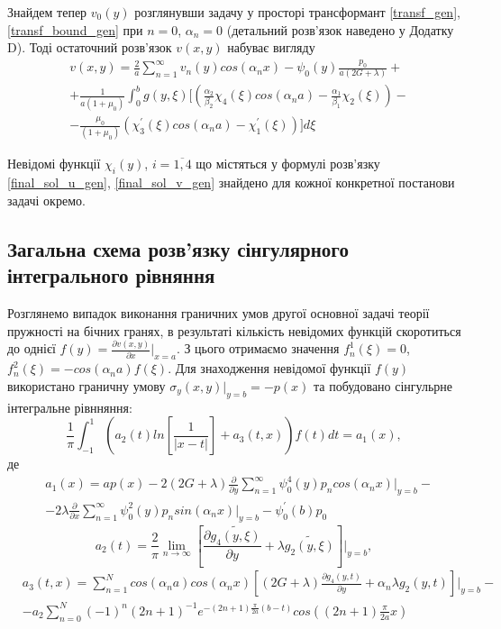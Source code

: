 Знайдем тепер $v_0(y)$ розглянувши задачу у просторі трансформант \eqref{transf_gen}, \eqref{transf_bound_gen} при $n=0$, $\alpha_n = 0$
(детальний розв'язок наведено у Додатку D). Тоді остаточний розв'язок $v(x,y)$ набуває вигляду
\begin{align}\label{final_sol_v_gen}
    &v(x,y) = \frac{2}{a} \sum_{n=1}^{\infty} v_n(y) cos(\alpha_n x) - \psi_0(y) \frac{p_0}{a(2G + \lambda)} + \nonumber \\
    &+ \frac{1}{a(1+\mu_0)} \int_{0}^{b}g(y,\xi) [ (\frac{\alpha_2}{\beta_2}\chi_4(\xi) cos(\alpha_n a) - \frac{\alpha_1}{\beta_1}\chi_2(\xi)) - \nonumber \\
    & - \frac{\mu_0}{(1+\mu_0)} (\chi_3^{'}(\xi) cos(\alpha_n a) -\chi_1^{'}(\xi)) ] d\xi
\end{align}

Невідомі функції $\chi_i(y)$, $i=\overline{1, 4}$ що містяться у формулі розв'язку \eqref{final_sol_u_gen}, \eqref{final_sol_v_gen} знайдено для кожної конкретної постанови задачі окремо.

\subsection{Загальна схема розв'язку сінгулярного інтегрального рівняння}
Розглянемо випадок виконання граничних умов другої основної задачі теорії пружності на бічних гранях, в результаті кількість невідомих функцій скоротиться до однієї $f(y) = \frac{\partial v(x,y)}{\partial x}|_{x=a}$.
З цього отримаємо значення $f_n^1(\xi) = 0$, $f_n^2(\xi)= -cos(\alpha_n a) f(\xi)$.
Для знаходження невідомої функції $f(y)$ використано граничну умову $\sigma_y(x, y) |_{y=b} = -p(x)$ та побудовано сінгульрне інтегральне рівнняння:
\begin{equation}\label{int_eq_gen}
    \frac{1}{\pi} \int_{-1}^{1} \left( a_2(t) ln\left[ \frac{1}{\lvert x - t \rvert} \right] + a_3(t, x) \right) f(t) dt = a_1(x),
\end{equation}
де
\begin{align*}
    &a_1(x) = a p(x) - 2(2G + \lambda) \frac{\partial}{\partial y} \sum_{n=1}^{\infty} \psi_0^{4}(y) p_n cos(\alpha_n x)|_{y=b} - \nonumber \\
    &- 2\lambda \frac{\partial}{\partial x} \sum_{n=1}^{\infty}\psi_0^2(y) p_n sin(\alpha_n x)|_{y=b} - \psi_0^{'}(b) p_0
\end{align*}
\begin{equation*}
    a_2(t) = \frac{2}{\pi} \lim_{n \rightarrow \infty}\left[ \frac{\partial \widetilde{g_4(y, \xi)}}{\partial y} + \lambda \widetilde{g_2(y, \xi)} \right]|_{y=b}, 
\end{equation*}
\begin{align*}
    &a_3(t, x) = \sum_{n=1}^{N} cos(\alpha_n a) cos(\alpha_n x) \left[(2G + \lambda) \frac{\partial g_4(y, t)}{\partial y} + \alpha_n \lambda g_2(y, t) \right]|_{y=b} - \\
    & - a_2 \sum_{n=0}^{N} (-1)^n (2n + 1)^{-1} e^{-(2n + 1) \frac{\pi}{2a} (b - t)} cos((2n + 1) \frac{\pi}{2a} x)
\end{align*}

